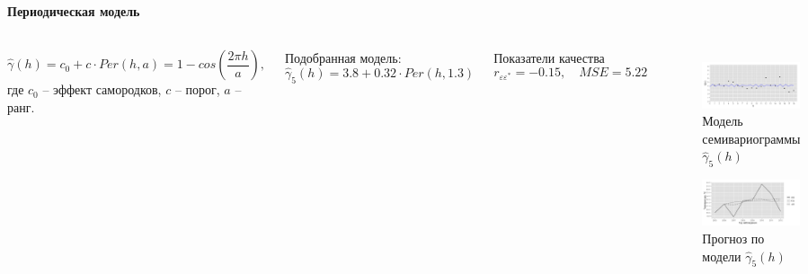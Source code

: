 \documentclass[notheorems]{beamer}
\theoremstyle{definition}
\theoremstyle{example}
\theoremstyle{plain}
\begin{document}
\begin{frame}
  \frametitle{\large\subsecname}
  \framesubtitle{Периодическая модель}
  \begin{columns}[c]
  {\footnotesize
  \begin{equation*}
    \widehat{\gamma}(h) = c_0 + c \cdot Per(h, a) = 1 - cos(\frac{2 \pi h}{a}),
  \end{equation*}
  где $ c_0 $ -- эффект самородков, $ c $ -- порог, $ a $ -- ранг.

  \vspace{0.5em}

  Подобранная модель:
  \begin{equation}
  \label{eq:gamma10}
    \widehat{\gamma}_5(h) = 3.8 + 0.32 \cdot Per(h, 1.3)
  \end{equation}

  Показатели качества
  \begin{equation*}
    r_{\varepsilon\varepsilon^{*}} = -0.15, \quad MSE = 5.22
  \end{equation*}
  }

  \vspace{-14.5pt}
  \begin{figure}[H]
    \includegraphics[width=0.9\linewidth]{../../figures/variogram/auto-class-18-modeled.png} \\
    \caption{Модель семивариограммы $\widehat{\gamma}_5(h)$}
    \includegraphics[width=0.9\linewidth]{../../figures/variogram/auto-class-18-cross-prediction.png}
    \caption{Прогноз по модели $\widehat{\gamma}_5(h)$}
  \end{figure}
  \end{columns}
\end{frame}
\end{document}
